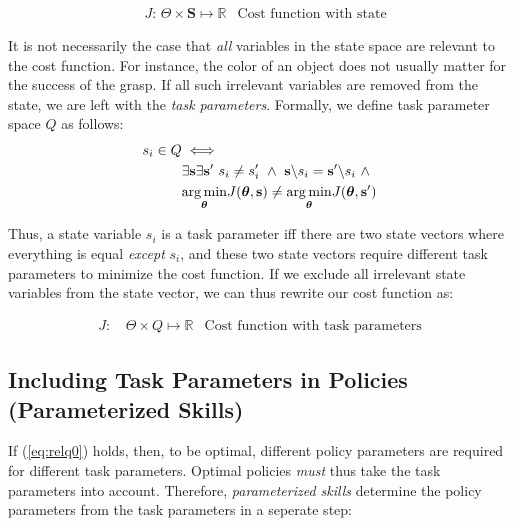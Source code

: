 \documentclass[12pt]{article}
\newcommand{\mymath}[1]{\ensuremath{#1}\xspace}
\newcommand{\pol}    {\mymath{\pi}}
\newcommand{\act}    {\mymath{\mathbf{a}}}
\newcommand{\actsp}  {\mymath{\mathbf{A}}}
\newcommand{\sta}    {\mymath{\mathbf{s}}}
\newcommand{\stasp}  {\mymath{\mathbf{S}}}
\newcommand{\app}    {\mymath{\bm{\theta}}}
\newcommand{\appsp}  {\mymath{\Theta}}
\newcommand{\taskp}  {\mymath{\mathbf{q}}}
\newcommand{\taskpsp}{\mymath{Q}}
\newcommand{\costf}  {\mymath{J}}
\DeclareMathOperator*{\argmin}{arg\,min}
\newcommand{\argminvar}[1]{\ensuremath{\underset{#1}{{\argmin}}}}
\begin{document}
\begin{align}
& \costf\mbox{: } \appsp \times \stasp \mapsto \mathbb{R}&\mbox{Cost function with state}\label{eq:cost_state}
\end{align}

It is not necessarily the case that \emph{all} variables in the state space are relevant to the cost function. For instance, the color of an object does not usually matter for the success of the grasp. If all such irrelevant variables are removed from the state, we are left with the \emph{task parameters}. Formally, we define task parameter space \taskpsp as follows:
%
\begin{align}
s_i \in \taskpsp &\iff\notag\\
&\exists \sta \exists \sta' ~s_i\neq s'_i ~\wedge~\sta\backslash s_i= \sta'\backslash s_i ~\wedge~\notag\\
&\argminvar{\app}\costf(\app,\sta) \neq \argminvar{\app}\costf(\app,\sta')\label{eq:relq0} 
\end{align}

Thus, a state variable $s_i$ is a task parameter iff there are two state vectors where everything is equal \emph{except} $s_i$, and these two state vectors require different task parameters to minimize the cost function.
If we exclude all irrelevant state variables from the state vector, we can thus rewrite our cost function as:

\begin{align}
\costf\mbox{: } &\label{eq:cost_task} \appsp \times \taskpsp \mapsto \mathbb{R}&\mbox{Cost function with task parameters}
\end{align}

\subsection{Including Task Parameters in Policies (Parameterized Skills)}

If (\ref{eq:relq0}) holds, then, to be optimal, different policy parameters are required for different task parameters. Optimal policies \emph{must} thus take the task parameters into account. 
Therefore, \emph{parameterized skills} determine the policy parameters from the task parameters in a seperate step:
%
%
\end{document}
